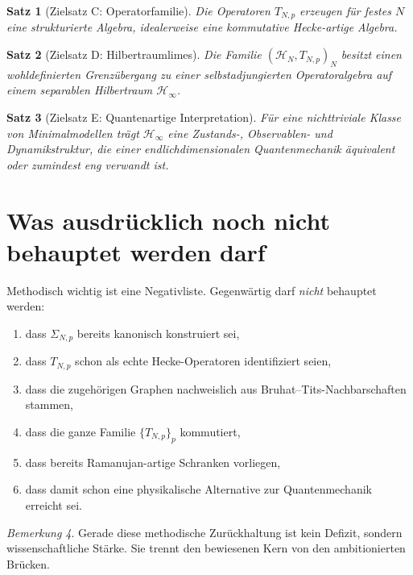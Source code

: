 \documentclass[12pt,a4paper]{article}
\theoremstyle{plain}
\newtheorem{satz}{Satz}[section]
\theoremstyle{definition}
\theoremstyle{remark}
\newtheorem{bemerkung}[satz]{Bemerkung}
\newcommand{\HN}{\mathcal H_N}
\newcommand{\Hinf}{\mathcal H_\infty}
\begin{document}
	\begin{satz}[Zielsatz C: Operatorfamilie]
		Die Operatoren \(T_{N,p}\) erzeugen für festes \(N\) eine strukturierte Algebra, idealerweise
		eine kommutative Hecke-artige Algebra.
	\end{satz}
	
	\begin{satz}[Zielsatz D: Hilbertraumlimes]
		Die Familie \((\HN,T_{N,p})_N\) besitzt einen wohldefinierten Grenzübergang zu einer
		selbstadjungierten Operatoralgebra auf einem separablen Hilbertraum \(\Hinf\).
	\end{satz}
	
	\begin{satz}[Zielsatz E: Quantenartige Interpretation]
		Für eine nichttriviale Klasse von Minimalmodellen trägt \(\Hinf\) eine Zustands-,
		Observablen- und Dynamikstruktur, die einer endlichdimensionalen Quantenmechanik
		äquivalent oder zumindest eng verwandt ist.
	\end{satz}
	
	\section{Was ausdrücklich noch nicht behauptet werden darf}
	
	Methodisch wichtig ist eine Negativliste. Gegenwärtig darf \emph{nicht} behauptet werden:
	
	\begin{enumerate}
		\item dass \(\Sigma_{N,p}\) bereits kanonisch konstruiert sei,
		\item dass \(T_{N,p}\) schon als echte Hecke-Operatoren identifiziert seien,
		\item dass die zugehörigen Graphen nachweislich aus Bruhat--Tits-Nachbarschaften stammen,
		\item dass die ganze Familie \(\{T_{N,p}\}_p\) kommutiert,
		\item dass bereits Ramanujan-artige Schranken vorliegen,
		\item dass damit schon eine physikalische Alternative zur Quantenmechanik erreicht sei.
	\end{enumerate}
	
	\begin{bemerkung}
		Gerade diese methodische Zurückhaltung ist kein Defizit, sondern wissenschaftliche
		Stärke. Sie trennt den bewiesenen Kern von den ambitionierten Brücken.
	\end{bemerkung}
	
\end{document}
